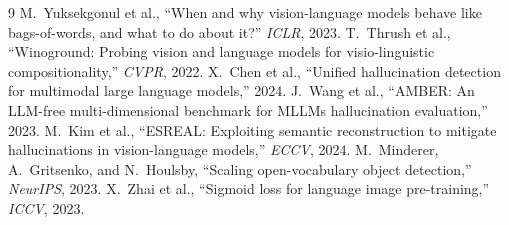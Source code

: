 \documentclass[conference]{IEEEtran}
\begin{document}
\begin{thebibliography}{9}
 M.~Yuksekgonul et al., ``When and why vision-language
models behave like bags-of-words, and what to do about it?'' \emph{ICLR}, 2023.
 T.~Thrush et al., ``Winoground: Probing vision and language
models for visio-linguistic compositionality,'' \emph{CVPR}, 2022.
 X.~Chen et al., ``Unified hallucination detection for
multimodal large language models,'' 2024.
 J.~Wang et al., ``AMBER: An LLM-free multi-dimensional
benchmark for MLLMs hallucination evaluation,'' 2023.
 M.~Kim et al., ``ESREAL: Exploiting semantic reconstruction
to mitigate hallucinations in vision-language models,'' \emph{ECCV}, 2024.
 M.~Minderer, A.~Gritsenko, and N.~Houlsby, ``Scaling
open-vocabulary object detection,'' \emph{NeurIPS}, 2023.
 X.~Zhai et al., ``Sigmoid loss for language image
pre-training,'' \emph{ICCV}, 2023.
\end{thebibliography}
\end{document}
